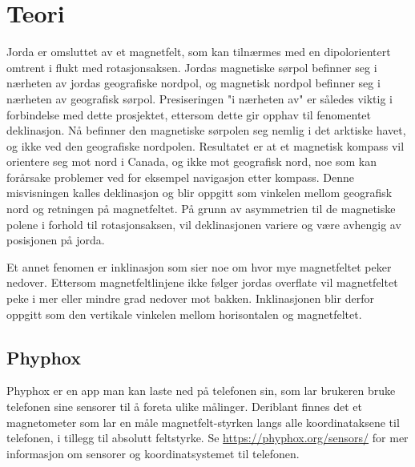 \section{Teori}
Jorda er omsluttet av et magnetfelt, som kan tilnærmes med en 
dipolorientert omtrent i flukt med rotasjonsaksen. Jordas magnetiske sørpol 
befinner seg i nærheten av jordas geografiske nordpol, og magnetisk nordpol 
befinner seg i nærheten av geografisk sørpol. Presiseringen "i nærheten av" 
er således viktig i forbindelse med dette prosjektet, ettersom dette gir 
opphav til fenomentet deklinasjon. Nå befinner den magnetiske sørpolen seg 
nemlig i det arktiske havet, og ikke ved den geografiske nordpolen. \cite{wandering_poles} Resultatet er at et magnetisk 
kompass vil orientere seg mot nord i Canada, og ikke mot geografisk nord, 
noe som kan forårsake problemer ved for eksempel navigasjon etter kompass. 
Denne misvisningen kalles deklinasjon og blir oppgitt som vinkelen mellom 
geografisk nord og retningen på magnetfeltet. På grunn av asymmetrien til 
de magnetiske polene i forhold til rotasjonsaksen, vil deklinasjonen 
variere og være avhengig av posisjonen på jorda. \cite{World_magnetic_model}

Et annet fenomen er inklinasjon som sier noe om hvor mye magnetfeltet peker 
nedover. Ettersom magnetfeltlinjene ikke følger jordas overflate vil 
magnetfeltet peke i mer eller mindre grad nedover mot bakken. Inklinasjonen 
blir derfor oppgitt som den vertikale vinkelen mellom horisontalen og
magnetfeltet.

\subsection{Phyphox}
Phyphox er en app man kan laste ned på telefonen sin, som lar brukeren 
bruke telefonen sine sensorer til å foreta ulike målinger. Deriblant finnes 
det et magnetometer som lar en måle magnetfelt-styrken langs alle 
koordinataksene til telefonen, i tillegg til absolutt feltstyrke. Se 
\hyperlink{https://phyphox.org/sensors/}{https://phyphox.org/sensors/}
for mer informasjon om sensorer og koordinatsystemet til telefonen.

